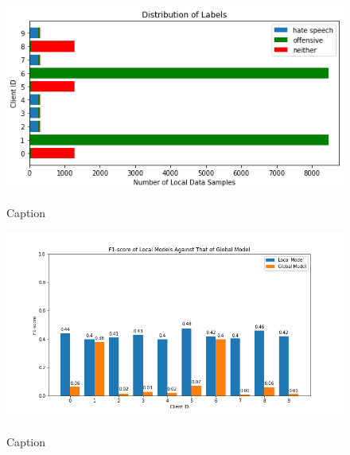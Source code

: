 \documentclass[letterpaper]{article} %
\begin{document}
\begin{figure}[hbt!]
{\includegraphics[width=\columnwidth]{noniid-quantity-based-label-imbalance-1_distribution_of_labels_5}}
\caption{Caption}
\end{figure}
\begin{figure}[hbt!]
{\includegraphics[width=\columnwidth]{noniid-quantity-based-label-imbalance-1_seed_5performance_of_models_on_client_data_f1score}}
\caption{Caption}
\end{figure}
\end{document}
